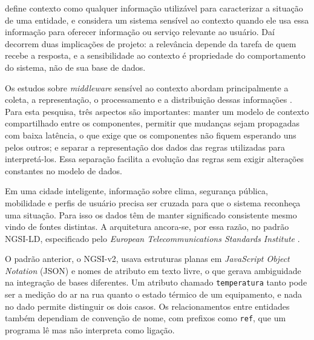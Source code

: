  define contexto como qualquer informação utilizável para caracterizar a situação de uma entidade, e considera um sistema sensível ao contexto quando ele usa essa informação para oferecer informação ou serviço relevante ao usuário. Daí decorrem duas implicações de projeto: a relevância depende da tarefa de quem recebe a resposta, e a sensibilidade ao contexto é propriedade do comportamento do sistema, não de sua base de dados.

Os estudos sobre \textit{middleware} sensível ao contexto abordam principalmente a coleta, a representação, o processamento e a distribuição dessas informações \cite{liang2015social,sezer2018context,lopes2009context,lopes2013middleware}. Para esta pesquisa, três aspectos são importantes: manter um modelo de contexto compartilhado entre os componentes, permitir que mudanças sejam propagadas com baixa latência, o que exige que os componentes não fiquem esperando uns pelos outros; e separar a representação dos dados das regras utilizadas para interpretá-los. Essa separação facilita a evolução das regras sem exigir alterações constantes no modelo de dados.

Em uma cidade inteligente, informação sobre clima, segurança pública, mobilidade e perfis de usuário precisa ser cruzada para que o sistema reconheça uma situação. Para isso os dados têm de manter significado consistente mesmo vindo de fontes distintas. A arquitetura ancora-se, por essa razão, no padrão NGSI-LD, especificado pelo \textit{European Telecommunications Standards Institute} \cite{etsi2024ngsild}.

O padrão anterior, o NGSI-v2, usava estruturas planas em \textit{JavaScript Object Notation} (JSON) e nomes de atributo em texto livre, o que gerava ambiguidade na integração de bases diferentes. Um atributo chamado \texttt{temperatura} tanto pode ser a medição do ar na rua quanto o estado térmico de um equipamento, e nada no dado permite distinguir os dois casos. Os relacionamentos entre entidades também dependiam de convenção de nome, com prefixos como \texttt{ref}, que um programa lê mas não interpreta como ligação.

